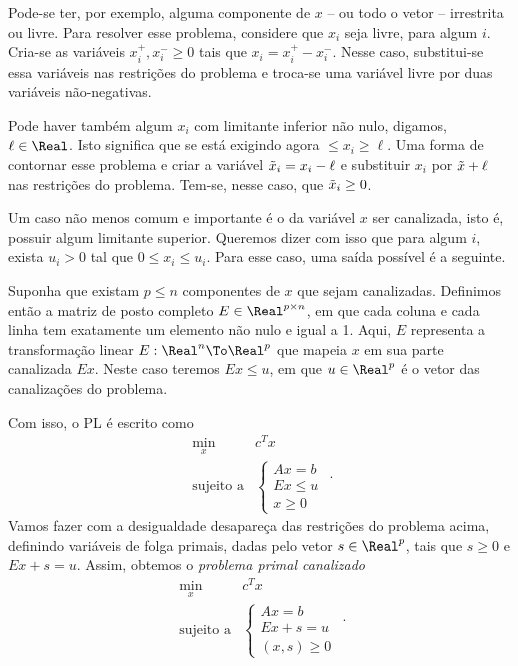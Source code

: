 Pode-se ter, por exemplo, alguma componente de $x$ -- ou todo o vetor -- irrestrita ou livre. Para resolver esse problema, considere que $x_{i}$ seja livre, para algum $i$. Cria-se as variáveis $x_{i}^{+},x_{i}^{-}\geq 0$ tais que $x_{i} = x_{i}^{+} -  x_{i}^{-}$. Nesse caso, substitui-se essa variáveis nas restrições do problema e troca-se uma variável livre por duas variáveis não-negativas. 

Pode haver também algum $x_{i}$ com limitante inferior não nulo, digamos, $\ell\in\Real$. Isto significa que se está exigindo agora $\leq x_{i}\geq \ell$. Uma forma de  contornar esse problema e  criar a variável $\tilde{x}_{i} = x_{i} - \ell$ e substituir $x_{i}$ por $\tilde{x} +\ell $ nas restrições do problema. Tem-se, nesse caso, que $\tilde{x}_{i} \geq 0$.


Um caso não menos comum e importante é o da variável $x$ ser canalizada, isto é, possuir algum limitante superior. Queremos dizer com isso que para algum $i$, exista  $u_i>0$ tal que $0\leq x_{i} \leq u_{i}$. Para esse caso, uma saída possível é a seguinte. 

Suponha que existam $p\leq n$ componentes de $x$ que sejam canalizadas. Definimos então a matriz de posto completo $E\in\Real^{p\times n}$, em que cada coluna e cada linha tem exatamente um elemento não nulo e igual a 1. Aqui, $E$  representa a transformação linear $E:\Real^{n}\To \Real^{p}$ que mapeia $x$ em sua parte canalizada $Ex$. Neste caso teremos $Ex \leq u$, em que $u\in\Real^{p}$ é o vetor das canalizações do problema.


Com isso, o \ac{PL} é escrito como 
\begin{equation*}
	\begin{array}{lc}
\displaystyle \min_{x} & c^Tx \\
\text{sujeito a} &\begin{cases} Ax = b \\
								Ex \leq u	\\				 
				 x \geq 0	
				 \end{cases}
\end{array}.
\end{equation*}
Vamos fazer com a desigualdade desapareça das restrições do problema acima, definindo variáveis de folga primais, dadas pelo vetor $s\in\Real^{p}$, tais que $s\geq 0$ e $Ex +s =  u$. Assim, obtemos o \emph{problema primal canalizado}
\begin{equation}
\label{eq:introPL-primal-bounded}
	\begin{array}{lc}
\displaystyle \min_{x} & c^Tx \\
\text{sujeito a} &\begin{cases} Ax = b \\
								Ex +s =  u	\\				 
				 (x,s) \geq 0	
				 \end{cases}
\end{array}.
\end{equation}


